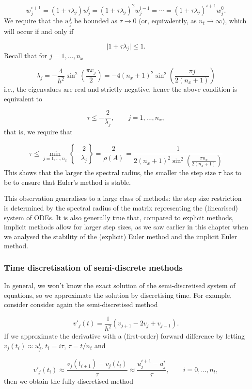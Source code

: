 \documentclass[12pt,landscape]{article}
\begin{document}
{\[
w^{i+1}_j = \left(1 + \tau \lambda_j\right)w_j^i = \left(1 + \tau \lambda_j\right)^2w_j^{i-1} = \cdots = \left(1 + \tau \lambda_j\right)^{i+1}w_j^{0}.
\]
We require that the $w^{i}_j$ be bounded as $\tau \to 0$ (or, equivalently, as $n_t \to \infty$), which will occur if and only if

\[
\vert 1 + \tau \lambda_j \vert \leq 1.
\]
Recall that for $j = 1, \ldots, n_x$

\[
\lambda_j = -\frac{4}{h^2}\sin^2\left(\frac{\pi x_j}{2} \right) = -4(n_x+1)^2\sin^2\left(\frac{\pi j}{2(n_x +1)} \right) 
\]
i.e., the eigenvalues are real and strictly negative, hence the above condition is equivalent to

\[
\tau \leq -\frac{2}{\lambda_j}, \qquad j = 1, \ldots, n_x,
\]
that is, we require that

\[
\tau  \leq \min_{j = 1, \ldots, n_x}\left\lbrace  -\frac{2}{\lambda_j}  \right\rbrace = \frac{2}{\rho(A)} = \frac{1}{2(n_x+1)^2\sin^2\left(\frac{\pi n_x}{2(n_x +1)} \right)}
\]
This shows that the larger the spectral radius, the smaller the step size $\tau$ has to be to ensure that Euler's method is stable.  

This observation generalises to a large class of methods: the step size restriction is determined by the spectral radius of the matrix representing the (linearised) system of ODEs.  It is also generally true that, compared to explicit methods, implicit methods allow for larger step sizes, as we saw earlier in this chapter when we analysed the stability of the (explicit) Euler method and the implicit Euler method.  

\subsubsection{Time discretisation of semi-discrete methods}
In general, we won't know the exact solution of the semi-discretised system of equations, so we approximate the solution by discretising time.  For example, consider consider again the semi-discretised method 

\[
v'_j(t) = \frac{1}{h^2}\left(v_{j+1} - 2v_j + v_{j-1}   \right).
\]
If we approximate the derivative with a (first-order) forward difference by letting $v_j(t_i) \approx u^i_j$, $t_i = i\tau$, $\tau = t/n_t$ and 

\[
v'_j(t_i) \approx \frac{v_j(t_{i+1}) - v_j(t_i)}{\tau} \approx \frac{u^{i+1}_j - u^i_j}{\tau}, \qquad i = 0, \ldots, n_t,
\]
then we obtain the fully discretised method

}
\end{document}
